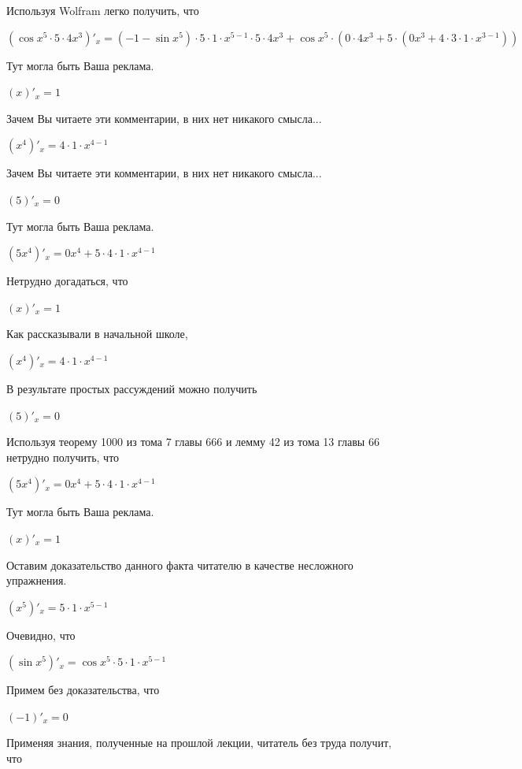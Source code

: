 \documentclass[12pt,a4paper,fleqn]{article}
\theoremstyle{definition}
\begin{document}
Используя Wolfram легко получить, что 

$(\cos{ x }^{ 5 } \cdot  5  \cdot  4 { x }^{ 3 })'_{x} = ( -1  - \sin{ x }^{ 5 }) \cdot  5  \cdot  1  \cdot { x }^{ 5  -  1 } \cdot  5  \cdot  4 { x }^{ 3 } + \cos{ x }^{ 5 } \cdot ( 0  \cdot  4 { x }^{ 3 } +  5  \cdot ( 0 { x }^{ 3 } +  4  \cdot  3  \cdot  1  \cdot { x }^{ 3  -  1 }))$

Тут могла быть Ваша реклама. 

$( x )'_{x} =  1 $

Зачем Вы читаете эти комментарии, в них нет никакого смысла... 

$({ x }^{ 4 })'_{x} =  4  \cdot  1  \cdot { x }^{ 4  -  1 }$

Зачем Вы читаете эти комментарии, в них нет никакого смысла... 

$( 5 )'_{x} =  0 $

Тут могла быть Ваша реклама. 

$( 5 { x }^{ 4 })'_{x} =  0 { x }^{ 4 } +  5  \cdot  4  \cdot  1  \cdot { x }^{ 4  -  1 }$

Нетрудно догадаться, что 

$( x )'_{x} =  1 $

Как рассказывали в начальной школе, 

$({ x }^{ 4 })'_{x} =  4  \cdot  1  \cdot { x }^{ 4  -  1 }$

В результате простых рассуждений можно получить 

$( 5 )'_{x} =  0 $

Используя теорему 1000 из тома 7 главы 666 и лемму 42 из тома 13 главы 66 нетрудно получить, что 

$( 5 { x }^{ 4 })'_{x} =  0 { x }^{ 4 } +  5  \cdot  4  \cdot  1  \cdot { x }^{ 4  -  1 }$

Тут могла быть Ваша реклама. 

$( x )'_{x} =  1 $

Оставим доказательство данного факта читателю в качестве несложного упражнения. 

$({ x }^{ 5 })'_{x} =  5  \cdot  1  \cdot { x }^{ 5  -  1 }$

Очевидно, что 

$(\sin{ x }^{ 5 })'_{x} = \cos{ x }^{ 5 } \cdot  5  \cdot  1  \cdot { x }^{ 5  -  1 }$

Примем без доказательства, что 

$( -1 )'_{x} =  0 $

Применяя знания, полученные на прошлой лекции, читатель без труда получит, что 
\end{document}
